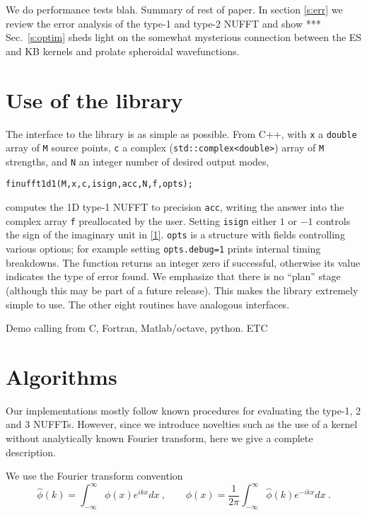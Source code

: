 \documentclass[10pt]{article}
\newcommand{\be}{\begin{equation}}
\newcommand{\ee}{\end{equation}}
\newcommand{\intR}{\int_{-\infty}^\infty}
\begin{document}
We do performance tests blah.
Summary of rest of paper.
In section \ref{s:err} we review the error analysis of the type-1 and type-2
NUFFT and show ***
Sec.~\ref{s:optim} sheds light on the somewhat mysterious
connection between the ES and KB kernels and prolate spheroidal wavefunctions.




\section{Use of the library}

The interface to the library is as
simple as possible.
From C++, with {\tt x} a {\tt double} array of {\tt M} source points,
{\tt c} a complex ({\tt std::complex<double>}) array of {\tt M} strengths,
and {\tt N} an integer number of desired output modes,
\begin{verbatim}
finufft1d1(M,x,c,isign,acc,N,f,opts);
\end{verbatim}
computes the 1D type-1 NUFFT to precision {\tt acc}, writing the
answer into the complex array {\tt f} preallocated by the user.
Setting {\tt isign} either $1$ or $-1$ controls the
sign of the imaginary unit in \eqref{1}.
{\tt opts} is a structure with fields controlling various options;
for example setting {\tt opts.debug=1} prints internal timing breakdowns.
The function returns an integer zero if successful, otherwise
its value indicates the type of error found.
We emphasize that there is no ``plan'' stage
(although this may be part of a future release).
This makes the library extremely simple to use.
The other eight routines have analogous interfaces.


Demo calling from C, Fortran, Matlab/octave, python.
ETC


\section{Algorithms}

Our implementations mostly follow known procedures
for evaluating the type-1, 2 and 3 NUFFTs.
However, since we introduce novelties such as the
use of a kernel without analytically known Fourier transform,
here we give a complete description.

We use the Fourier transform convention
\be
\hat\phi(k) = \intR \phi(x) e^{ikx} dx
~,\qquad
\phi(x) = \frac{1}{2\pi} \intR \hat\phi(k) e^{-ikx} dx
~.
\label{FT}
\ee
\end{document}

